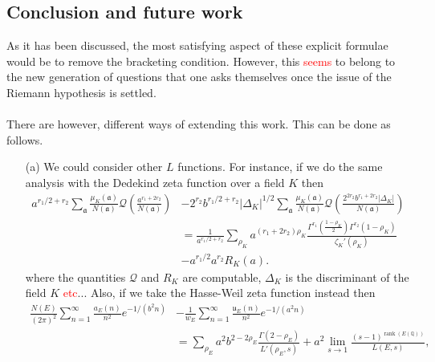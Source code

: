 \documentclass[11pt]{article}
\newcommand{\Q}{\mathbb{Q}}
\numberwithin{equation}{section}		 			%
\numberwithin{figure}{section}			 			%
\begin{document}
\subsection{Conclusion and future work}
\noindent As it has been discussed, the most satisfying aspect of these explicit formulae would be to remove the bracketing condition. However, this \textcolor{red}{seems} to belong to the new generation of questions that one asks themselves once the issue of the Riemann hypothesis is settled.\\\\
There are however, different ways of extending this work. This can be done as follows.
\begin{enumerate}
\item[(a)] We could consider other $L$ functions. For instance, if we do the same analysis with the Dedekind zeta function over a field $K$ then
\begin{align}
  {a^{{r_1}/2 + {r_2}}}\sum\limits_\mathfrak{a} {\frac{{{\mu _K}(\mathfrak{a})}}{{N(\mathfrak{a})}}\mathcal{Q}\left( {\frac{{{a^{{r_1} + 2{r_2}}}}}{{N(\mathfrak{a})}}} \right)}  &- {2^{{r_2}}}{b^{{r_1}/2 + {r_2}}}{\left| {{\Delta _K}} \right|^{1/2}}\sum\limits_\mathfrak{a} {\frac{{{\mu _K}(\mathfrak{a})}}{{N(\mathfrak{a})}}\mathcal{Q}\left( {\frac{{{2^{2{r_2}}}{b^{{r_1} + 2{r_2}}}\left| {{\Delta _K}} \right|}}{{N(\mathfrak{a})}}} \right)}  \nonumber \\
   &= \frac{1}{{{a^{{r_1}/2 + {r_2}}}}}\sum\limits_{{\rho _K}} {{a^{({r_1} + 2{r_2}){\rho _K}}}\frac{{{\Gamma ^{{r_1}}}(\tfrac{{1 - {\rho _K}}}{2}){\Gamma ^{{r_2}}}(1 - {\rho _K})}}{{{\zeta _K}'({\rho _K})}}}  \nonumber \\
	&- {a^{{r_1}/2}}{a^{{r_2}}}R_K(a). \nonumber 
\end{align}
where the quantities $\mathcal{Q}$ and $R_K$ are computable, $\Delta_K$ is the discriminant of the field $K$ \textcolor{red}{etc}... Also, if we take the Hasse-Weil zeta function instead then
\begin{align}
  \frac{{N(E)}}{{{{(2\pi )}^2}}}\sum\limits_{n = 1}^\infty  {\frac{{{a_E}(n)}}{{{n^2}}}{e^{ - 1/({b^2}n)}}}  &- \frac{1}{{{w_E}}}\sum\limits_{n = 1}^\infty  {\frac{{{\mathfrak{u}_E}(n)}}{{{n^2}}}{e^{ - 1/({a^2}n)}}}  \nonumber \\
   &= \sum\limits_{{\rho _E}} {{a^2}{b^{2 - 2{\rho _E}}}\frac{{\Gamma (2 - {\rho _E})}}{{L'({\rho _E},s)}}}  + {a^2}\mathop {\lim }\limits_{s \to 1} \frac{{{{(s - 1)}^{\operatorname{rank} (E(\Q))}}}}{{L(E,s)}}, \nonumber 
\end{align}

\end{enumerate}
\end{document}
